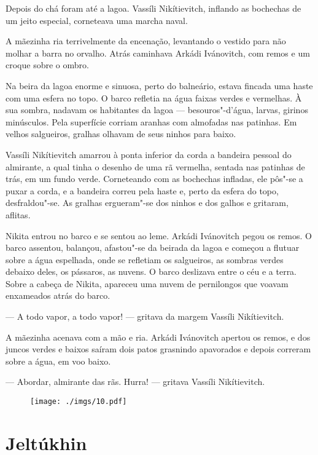 Depois do chá foram até a lagoa. Vassíli Nikítievitch, inflando as
bochechas de um jeito especial, corneteava uma marcha naval.

A mãezinha ria terrivelmente da encenação, levantando o vestido para não
molhar a barra no orvalho. Atrás caminhava Arkádi Ivánovitch, com remos
e um croque sobre o ombro.

Na beira da lagoa enorme e sinuosa, perto do balneário, estava fincada
uma haste com uma esfera no topo. O barco refletia na água faixas verdes
e vermelhas. À sua sombra, nadavam os habitantes da lagoa ---
besouros"-d'água, larvas, girinos minúsculos. Pela superfície corriam
aranhas com almofadas nas patinhas. Em velhos salgueiros, gralhas
olhavam de seus ninhos para baixo.

Vassíli Nikítievitch amarrou à ponta inferior da corda a bandeira
pessoal do almirante, a qual tinha o desenho de uma rã vermelha, sentada
nas patinhas de trás, em um fundo verde. Corneteando com as bochechas
infladas, ele pôs"-se a puxar a corda, e a bandeira correu pela haste e,
perto da esfera do topo, desfraldou"-se. As gralhas ergueram"-se dos ninhos
e dos galhos e gritaram, aflitas.

Nikita entrou no barco e se sentou ao leme. Arkádi Ivánovitch pegou os
remos. O barco assentou, balançou, afastou"-se da beirada da lagoa e
começou a flutuar sobre a água espelhada, onde se refletiam os
salgueiros, as sombras verdes debaixo deles, os pássaros, as nuvens. O
barco deslizava entre o céu e a terra. Sobre a cabeça de Nikita,
apareceu uma nuvem de pernilongos que voavam enxameados atrás do barco.

--- A todo vapor, a todo vapor! --- gritava da margem Vassíli
Nikítievitch.

A mãezinha acenava com a mão e ria. Arkádi Ivánovitch apertou os remos,
e dos juncos verdes e baixos saíram dois patos grasnindo apavorados e
depois correram sobre a água, em voo baixo.

--- Abordar, almirante das rãs. Hurra! --- gritava Vassíli Nikítievitch.

\begin{figure}
\vspace*{-2.1cm}
\hspace*{-2.5cm}\texttt{[image: ./imgs/10.pdf]}
\end{figure}

\chapter{Jeltúkhin}


